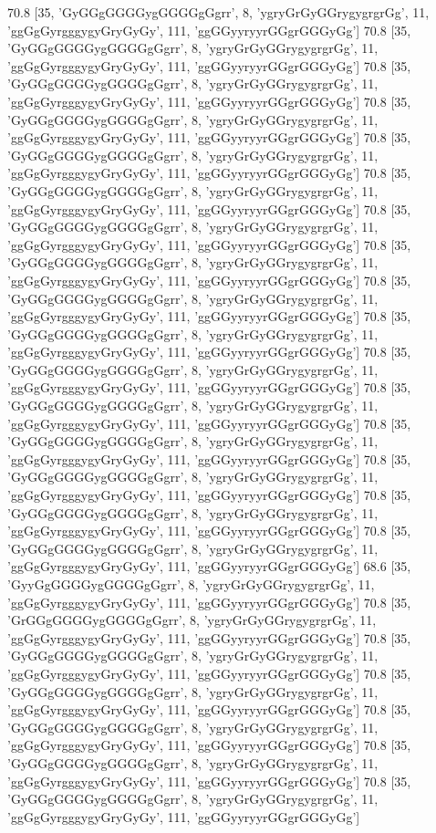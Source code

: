 70.8 [35, 'GyGGgGGGGygGGGGgGgrr', 8, 'ygryGrGyGGrygygrgrGg', 11, 'ggGgGyrgggygyGryGyGy', 111, 'ggGGyyryyrGGgrGGGyGg']
70.8 [35, 'GyGGgGGGGygGGGGgGgrr', 8, 'ygryGrGyGGrygygrgrGg', 11, 'ggGgGyrgggygyGryGyGy', 111, 'ggGGyyryyrGGgrGGGyGg']
70.8 [35, 'GyGGgGGGGygGGGGgGgrr', 8, 'ygryGrGyGGrygygrgrGg', 11, 'ggGgGyrgggygyGryGyGy', 111, 'ggGGyyryyrGGgrGGGyGg']
70.8 [35, 'GyGGgGGGGygGGGGgGgrr', 8, 'ygryGrGyGGrygygrgrGg', 11, 'ggGgGyrgggygyGryGyGy', 111, 'ggGGyyryyrGGgrGGGyGg']
70.8 [35, 'GyGGgGGGGygGGGGgGgrr', 8, 'ygryGrGyGGrygygrgrGg', 11, 'ggGgGyrgggygyGryGyGy', 111, 'ggGGyyryyrGGgrGGGyGg']
70.8 [35, 'GyGGgGGGGygGGGGgGgrr', 8, 'ygryGrGyGGrygygrgrGg', 11, 'ggGgGyrgggygyGryGyGy', 111, 'ggGGyyryyrGGgrGGGyGg']
70.8 [35, 'GyGGgGGGGygGGGGgGgrr', 8, 'ygryGrGyGGrygygrgrGg', 11, 'ggGgGyrgggygyGryGyGy', 111, 'ggGGyyryyrGGgrGGGyGg']
70.8 [35, 'GyGGgGGGGygGGGGgGgrr', 8, 'ygryGrGyGGrygygrgrGg', 11, 'ggGgGyrgggygyGryGyGy', 111, 'ggGGyyryyrGGgrGGGyGg']
70.8 [35, 'GyGGgGGGGygGGGGgGgrr', 8, 'ygryGrGyGGrygygrgrGg', 11, 'ggGgGyrgggygyGryGyGy', 111, 'ggGGyyryyrGGgrGGGyGg']
70.8 [35, 'GyGGgGGGGygGGGGgGgrr', 8, 'ygryGrGyGGrygygrgrGg', 11, 'ggGgGyrgggygyGryGyGy', 111, 'ggGGyyryyrGGgrGGGyGg']
70.8 [35, 'GyGGgGGGGygGGGGgGgrr', 8, 'ygryGrGyGGrygygrgrGg', 11, 'ggGgGyrgggygyGryGyGy', 111, 'ggGGyyryyrGGgrGGGyGg']
70.8 [35, 'GyGGgGGGGygGGGGgGgrr', 8, 'ygryGrGyGGrygygrgrGg', 11, 'ggGgGyrgggygyGryGyGy', 111, 'ggGGyyryyrGGgrGGGyGg']
70.8 [35, 'GyGGgGGGGygGGGGgGgrr', 8, 'ygryGrGyGGrygygrgrGg', 11, 'ggGgGyrgggygyGryGyGy', 111, 'ggGGyyryyrGGgrGGGyGg']
70.8 [35, 'GyGGgGGGGygGGGGgGgrr', 8, 'ygryGrGyGGrygygrgrGg', 11, 'ggGgGyrgggygyGryGyGy', 111, 'ggGGyyryyrGGgrGGGyGg']
70.8 [35, 'GyGGgGGGGygGGGGgGgrr', 8, 'ygryGrGyGGrygygrgrGg', 11, 'ggGgGyrgggygyGryGyGy', 111, 'ggGGyyryyrGGgrGGGyGg']
70.8 [35, 'GyGGgGGGGygGGGGgGgrr', 8, 'ygryGrGyGGrygygrgrGg', 11, 'ggGgGyrgggygyGryGyGy', 111, 'ggGGyyryyrGGgrGGGyGg']
68.6 [35, 'GyyGgGGGGygGGGGgGgrr', 8, 'ygryGrGyGGrygygrgrGg', 11, 'ggGgGyrgggygyGryGyGy', 111, 'ggGGyyryyrGGgrGGGyGg']
70.8 [35, 'GrGGgGGGGygGGGGgGgrr', 8, 'ygryGrGyGGrygygrgrGg', 11, 'ggGgGyrgggygyGryGyGy', 111, 'ggGGyyryyrGGgrGGGyGg']
70.8 [35, 'GyGGgGGGGygGGGGgGgrr', 8, 'ygryGrGyGGrygygrgrGg', 11, 'ggGgGyrgggygyGryGyGy', 111, 'ggGGyyryyrGGgrGGGyGg']
70.8 [35, 'GyGGgGGGGygGGGGgGgrr', 8, 'ygryGrGyGGrygygrgrGg', 11, 'ggGgGyrgggygyGryGyGy', 111, 'ggGGyyryyrGGgrGGGyGg']
70.8 [35, 'GyGGgGGGGygGGGGgGgrr', 8, 'ygryGrGyGGrygygrgrGg', 11, 'ggGgGyrgggygyGryGyGy', 111, 'ggGGyyryyrGGgrGGGyGg']
70.8 [35, 'GyGGgGGGGygGGGGgGgrr', 8, 'ygryGrGyGGrygygrgrGg', 11, 'ggGgGyrgggygyGryGyGy', 111, 'ggGGyyryyrGGgrGGGyGg']
70.8 [35, 'GyGGgGGGGygGGGGgGgrr', 8, 'ygryGrGyGGrygygrgrGg', 11, 'ggGgGyrgggygyGryGyGy', 111, 'ggGGyyryyrGGgrGGGyGg']

